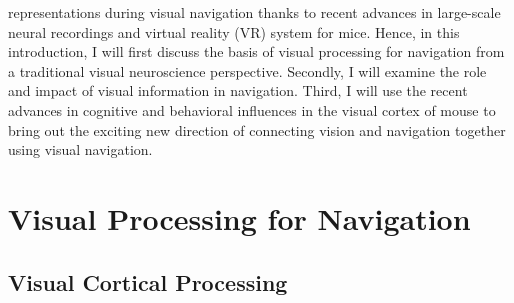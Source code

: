representations during visual navigation thanks to recent advances in large-scale neural recordings and virtual reality (VR) system for mice. Hence, in this introduction, I will first discuss the basis of visual processing for navigation from a traditional visual neuroscience perspective. Secondly, I will examine the role and impact of visual information in navigation. Third, I will use the recent advances in cognitive and behavioral influences in the visual cortex of mouse to bring out the exciting new direction of connecting vision and navigation together using visual navigation.

\section{Visual Processing for Navigation}
\subsection{Visual Cortical Processing}

